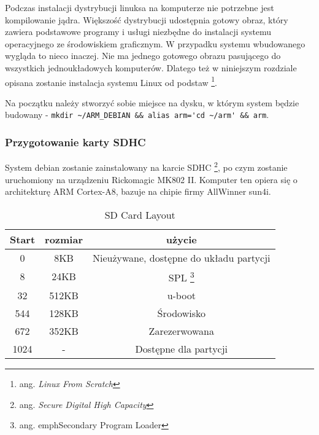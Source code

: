 Podczas instalacji dystrybucji linuksa na komputerze nie potrzebne jest kompilowanie jądra. Większość dystrybucji udostępnia gotowy obraz, który zawiera podstawowe programy i usługi niezbędne do instalacji systemu operacyjnego ze środowiskiem graficznym. W przypadku systemu wbudowanego wygląda to nieco inaczej. Nie ma jednego gotowego obrazu pasującego do wszystkich jednoukładowych komputerów. Dlatego też w niniejszym rozdziale opisana zostanie instalacja systemu Linux od podstaw \footnote{ang. \emph{Linux From Scratch}}.

\par


Na początku należy stworzyć sobie miejsce na dysku, w którym system będzie budowany - \lstinline{mkdir ~/ARM_DEBIAN && alias arm='cd ~/arm' && arm}.

\subsubsection{Przygotowanie karty SDHC}


System debian zostanie zainstalowany na karcie SDHC \footnote{ang. \em{Secure Digital High Capacity}}, po czym zostanie uruchomiony na urządzeniu Rickomagic MK802 II. Komputer ten opiera się o architekturę ARM Cortex-A8, bazuje na chipie firmy AllWinner sun4i.
\par
	\begin{table}[t]
		\centering
		\caption{SD Card Layout}
		\label{tab:sd-layout}
	\begin{tabular}{|c|c|c|}
	\hline
	\textbf{Start} & \textbf{rozmiar} & \textbf{użycie} \\ 
	\hline
	0 & 8KB & Nieużywane, dostępne do układu partycji \\
	\hline
	8 & 24KB & SPL \footnote{ang. emph{Secondary Program Loader}} \\
	\hline
	32 & 512KB & u-boot \\
	\hline
	544 & 128KB & Środowisko \\
	\hline
	672 & 352KB & Zarezerwowana \\
	\hline
	1024 & - & Dostępne dla partycji \\
	\hline
	
	
\end{tabular}
\end{table}

